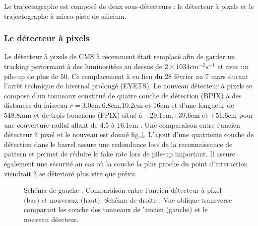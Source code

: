 Le trajectographe est composé de deux sous-détecteurs : le détecteur à pixels et le trajectographe à micro-piste de silicium.
\subsubsection{Le détecteur à pixels}
Le détecteur à pixels de CMS à récemment était remplacé afin de garder un tracking performant à des luminositées au dessus de $2\times10{34}cm^{-2}s^{-1}$ et avec un pile-up de plus de $50$. Ce remplacement à eu lieu du 28 février au 7 mars durant l'arrêt technique de hivernal prolongé (EYETS). Le nouveau détecteur à pixels se compose d'un tonneaux constitué de quatre couche de détection (BPIX) à des distances du faisceau $r=3.0$cm,6.8cm,10.2cm et 16cm et d'une longueur de 548.8mm et de trois bouchons (FPIX) situé à $\pm$29.1cm,$\pm$39.6cm et $\pm$51.6cm pour une couverture radial allant de 4.5 à 16.1cm . Une comparaison entre l'ancien détecteur à pixel et le nouveau est donné fig.\ref{pixel}. L'ajout d'une quatrieme couche de détection dans le barrel assure une redondance lors de la reconnaissance de pattern et permet de réduire le fake rate lors de pile-up important. Il assure également une sécurité au cas où la couche la plus proche du point d'interaction viendrait à se déterioré plus vite que prévu.
	\begin{figure}[h!]
	\caption{Schéma de gauche : Comparaison entre l'ancien détecteur à pixel (bas) et nouveaux (haut). Schèma de droite : Vue oblique-transverse comparant les couche des tonneaux de 'ancien (gauche) et le nouveau déecteur.}
	\label{pixel}
\end{figure}
